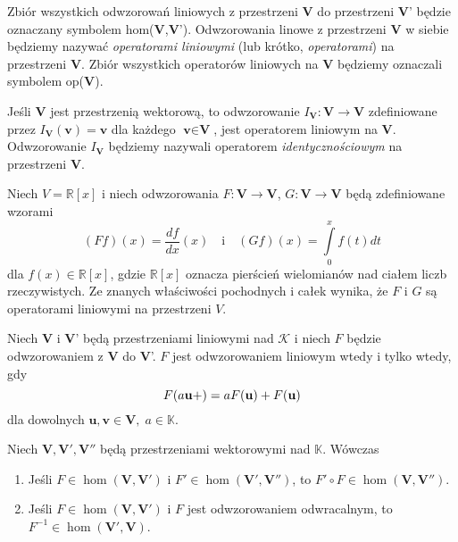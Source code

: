 	\begin{uwg}
		Zbiór wszystkich odwzorowań liniowych z przestrzeni \textbf{V} do przestrzeni \textbf{V}' będzie oznaczany symbolem hom(\textbf{V},\textbf{V}'). Odwzorowania linowe z przestrzeni \textbf{V} w siebie będziemy nazywać \textit{operatorami liniowymi} (lub krótko, \textit{operatorami}) na przestrzeni \textbf{V}. Zbiór wszystkich operatorów liniowych na $\textbf{V}$ będziemy oznaczali symbolem op(\textbf{V}).
	\end{uwg}
	
	\begin{przyk}
		Jeśli \textbf{V} jest przestrzenią wektorową, to odwzorowanie $I_{\textbf{V}} : \textbf{V} \to \textbf{V}$ zdefiniowane przez $I_{\textbf{V}}(\textbf{v}) = \textbf{v}$ dla każdego $\textbf{v} \in \textbf{V}$, jest operatorem liniowym na \textbf{V}. Odwzorowanie $I_{\textbf{V}}$ będziemy nazywali operatorem \textit{identycznościowym} na przestrzeni \textbf{V}. 
	\end{przyk}
	
	\begin{przyk}
		Niech $V = \mathbb{R}[x]$ i niech odwzorowania $F:\textbf{V} \to \textbf{V}$, $G:\textbf{V} \to \textbf{V}$ będą zdefiniowane wzorami
		\begin{equation*}
			(Ff)(x) = \frac{df}{dx}(x) \quad \text{i} \quad (Gf)(x) = \int\limits_{0}^{x} f(t)dt
		\end{equation*}
		dla $f(x) \in \mathbb{R}[x]$, gdzie $\mathbb{R}[x]$ oznacza pierścień wielomianów nad ciałem liczb rzeczywistych. Ze znanych właściwości pochodnych i całek wynika, że $F$ i $G$ są operatorami liniowymi na przestrzeni $V$.
	\end{przyk}
	
	\begin{tw}
		Niech \textbf{V} i \textbf{V}' będą przestrzeniami liniowymi nad $\mathcal{K}$ i niech $F$ będzie odwzorowaniem z \textbf{V} do \textbf{V}'. $F$ jest odwzorowaniem liniowym wtedy i tylko wtedy, gdy
		\begin{equation*}
			F(a\textbf{u} +\hfill) = aF(\textbf{u}) + F(\textbf{u})
		\end{equation*}
		dla dowolnych $\textbf{u},\textbf{v} \in \textbf{V}, \; a \in \mathbb{K}$.
	\end{tw}
	
	\begin{tw}
		Niech $\textbf{V}, \textbf{V}', \textbf{V}''$ będą przestrzeniami wektorowymi nad $\mathbb{K}$. Wówczas
		\begin{enumerate}
			\item Jeśli $F \in \hom(\textbf{V},\textbf{V}')$ i $F' \in \hom(\textbf{V}',\textbf{V}'')$, to $F' \circ F \in \hom(\textbf{V},\textbf{V}'')$.
			\item  Jeśli $F \in \hom(\textbf{V},\textbf{V}')$ i $F$ jest odwzorowaniem odwracalnym, to $F^{-1} \in \hom(\textbf{V}',\textbf{V})$.
		\end{enumerate}
	\end{tw}
	
